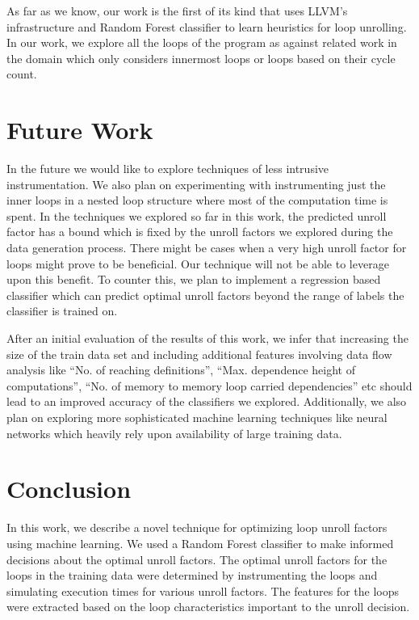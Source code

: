 \documentclass[]{sig-alternate}
\begin{document}
As far as we know, our work is the first of its kind that uses LLVM's infrastructure and Random Forest classifier to learn heuristics for loop unrolling. In our work, we explore all the loops of the program as against related work in the domain which only considers innermost loops or  loops based on their cycle count.

\section{Future Work}
\label{sec:FutureWork}
In the future we would like to explore techniques of less intrusive instrumentation. We also plan on experimenting with instrumenting just the inner loops in a nested loop structure where most of the computation time is spent. In the techniques we explored so far in this work, the predicted unroll factor has a bound which is fixed by the unroll factors we explored during the data generation process. There might be cases when a very high unroll factor for loops might prove to be beneficial. Our technique will not be able to leverage upon this benefit. To counter this, we plan to implement a regression based classifier which can predict optimal unroll factors beyond the range of labels the classifier is trained on.

After an initial evaluation of the results of this work, we infer that increasing the size of the train data set and including additional features involving data flow analysis like ``No. of reaching definitions'', ``Max. dependence height of computations'',  ``No. of memory to memory loop carried dependencies'' etc should lead to an improved accuracy of the classifiers we explored. Additionally, we also plan on exploring more sophisticated machine learning techniques like neural networks which heavily rely upon availability of large training data.

\section{Conclusion}
\label{sec:Conclusion}

In this work, we describe a novel technique for optimizing loop unroll factors using machine learning. We used a Random Forest classifier to make informed decisions about the optimal unroll factors. The optimal unroll factors for the loops in the training data were determined by instrumenting the loops and simulating execution times for various unroll factors. The features for the loops were extracted based on the loop characteristics important to the unroll decision.  
\end{document}
